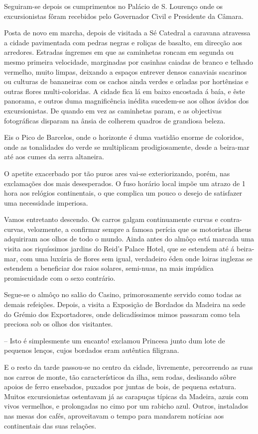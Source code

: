 \documentclass[9pt]{article}
\begin{document}
Seguiram-se depois os cumprimentos no Palácio de S. Lourenço on\-de os
excursionistas fôram recebidos pelo Governador Civil e Presidente da Câmara.

Posta de novo em marcha, depois de visitada a Sé Catedral a caravana atravessa a cidade pavimentada com pedras negras e roliças de basalto, em direc\-ção
aos arredores. Estradas íngremes em que as caminhetas roncam em segunda ou
mesmo primeira velocidade, marginadas por casinhas caiadas de branco e te\-lhado
verme\-lho, muito limpas, deixando a espaços entrever densos canaviais sacarinos
ou culturas de bananeiras com os cachos ainda verdes e orladas por hortênsias e
outras flores multi-coloridas. A cidade fi\-ca lá em baixo encostada á baía,
e êste panorama, e outros duma magnificência inédita sucedem-se aos o\-lhos ávidos dos excursionistas. De quan\-do em vez as caminhetas param, e as objectivas
fotográfi\-cas disparam na ânsia de co\-lherem quadros de grandiosa beleza.

Eis o Pico de Barcelos, onde o horizonte é duma vastidão enorme de coloridos, onde as tonalidades do verde se multiplicam prodigiosamente, desde a
beira-mar até aos cumes da serra altaneira.

O apetite exacerbado por tão puros ares vai-se exteriorizando, po\-rém,
nas exclama\-ções dos mais desesperados. O fuso horário local impõe um atrazo de 1 hora aos relógios continentais, o que complica um pouco o desejo
de satisfazer uma necessidade imperiosa.

Vamos entretanto descendo. Os carros galgam continuamente curvas e
contra-curvas, velozmente, a confirmar sempre a famosa perícia que os motoristas i\-lheus adquiriram aos o\-lhos de todo o mundo. Ainda antes do almôço
está marcada uma visita aos riquís\-si\-mos jardins do Reid's Palace Hotel,
que se estendem até á beira-mar, com uma luxúria de flores sem igual, verdadeiro éden onde loiras inglezas se estendem a beneficiar dos raios solares, semi-nuas, na mais impúdica promiscuidade com o sexo contrário.

Segue-se o almôço no salão do Casino, primorosamente servido co\-mo todas as demais refei\-ções. Depois, a visita a Exposi\-ção de Bordados da Madeira na sede do Grémio dos Exportadores, onde delicadís\-si\-mos mimos passaram
como tela preciosa sob os o\-lhos dos visitantes.

-- Isto é simplesmente um encanto! exclamou Princesa junto dum lote
de pequenos lenços, cujos bordados eram autêntica filigrana.

E o resto da tarde passou-se no centro da cidade, livremente, percorrendo as ruas nos carros de monte, tão característicos da i\-lha, sem rodas,
deslisando sôbre apoios de ferro ensebados, puxados por juntas de bois, de
pequena estatura. Muitos excursionistas ostentavam já as carapuças típicas da Madeira, azuis com vivos verme\-lhos, e prolongadas no cimo por um rabicho azul. Outros, instalados nas mesas dos cafés, aproveitavam o tempo
para mandarem notícias aos continentais das suas rela\-ções.
\end{document}
